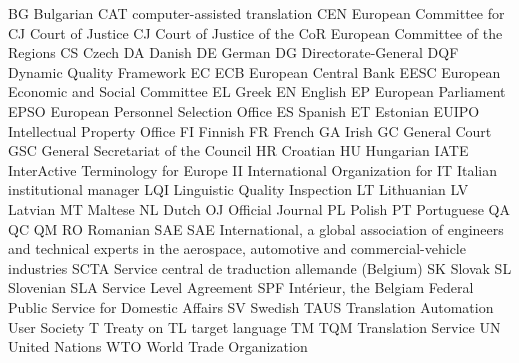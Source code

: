 \begin{refsection}
BG
Bulgarian
CAT
computer-assisted translation
CEN
European Committee for 
CJ
Court of Justice
CJ
Court of Justice of the 
CoR
European Committee of the Regions
CS
Czech
DA
Danish
DE
German
DG
Directorate-General
DQF
Dynamic Quality Framework
EC
ECB
European Central Bank
EESC
European Economic and Social Committee
EL
Greek
EN
English
EP
European Parliament
EPSO
European Personnel Selection Office
ES
Spanish
ET
Estonian
EUIPO
 Intellectual Property Office
FI
Finnish
FR
French
GA
Irish
GC
General Court
GSC
General Secretariat of the Council
HR
Croatian
HU
Hungarian
IATE
InterActive Terminology for Europe
II
International Organization for 
IT
Italian
institutional  manager
LQI
Linguistic Quality Inspection
LT
Lithuanian
LV
Latvian
MT
Maltese
NL
Dutch
OJ
Official Journal
PL
Polish
PT
Portuguese
QA
QC
QM
RO
Romanian
SAE
SAE International, a global association of engineers and technical experts in the aerospace, automotive and commercial-vehicle industries
SCTA
Service central de traduction allemande (Belgium)
SK
Slovak
SL
Slovenian
SLA
Service Level Agreement
SPF
Intérieur, the Belgiam Federal Public Service for Domestic Affairs
SV
Swedish
TAUS
Translation Automation User Society
T
Treaty on 
TL
target language
TM
TQM
Translation Service
UN
United Nations
WTO
World Trade Organization


\printbibliography[heading=subbibliography]
\end{refsection}

